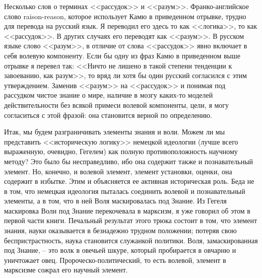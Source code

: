 \documentclass{book}
\begin{document}
Несколько слов о терминах <<рассудок>> и <<разум>>. Франко-английское слово raison-reason, которое использует Камю в приведенном отрывке, трудно для перевода на русский язык. Я переводил его здесь то как <<логика>>, то как <<рассудок>>. В других случаях его переводят как <<разум>>. В русском языке слово <<разум>>, в отличие от слова <<рассудок>> явно включает в себя волевую компоненту. Если бы одну из фраз Камю в при­веденном выше отрывке я перевел так: <<Ничто не лишено в такой степени тенденции к завоеванию, как разум>>, то вряд ли хотя бы один русский согласился с этим утверждением. Заменив <<разум>> на <<рассудок>> и понимая под рассудком чистое знание о мире, наличие в мозгу каких-то моделей действительности без всякой примеси волевой компоненты, цели, я могу согласиться с этой фразой: она становится верной по определению.

Итак, мы будем разграничивать элементы знания и воли. Можем ли мы представить <<историческую логику>> немецкой идеологии (лучше всего выраженную, очевидно, Гегелем) как пол­ную противоположность научному методу? Это было бы несправедливо, ибо она содержит также и познавательный элемент. Но, конечно, и волевой элемент, элемент установки, оценки, она содержит в избытке. Этим и объясняется ее активная исто­рическая роль. Беда не в том, что немецкая идеология пыталась соединить волевой и познавательный элементы, а в том, что в ней Воля маскировалась под Знание. Из Гегеля маскировка Воли под Знание перекочевала в марксизм, я уже говорил об этом в первой части книги. Печальный результат этого трюка состоит в том, что элемент знания, науки оказывается в безнадежно трудном положении; потеряв свою беспристрастность, наука становится служанкой политики. Воля, замаскированная под Знание, -- это волк в овечьей шкуре, который пробирается в овчарню и уничтожает овец. Пророческо-политический, то есть волевой, элемент в 
марксизме сожрал его научный элемент.
\end{document}

